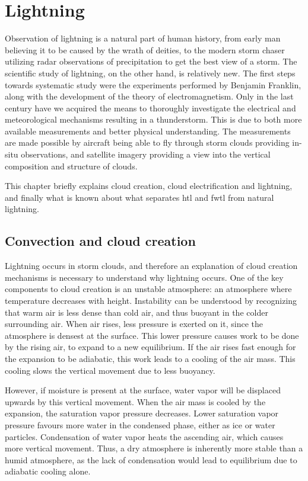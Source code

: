\setcounter{chapter}{1} 

\chapter{Lightning}\label{ch:lightning}
Observation of lightning is a  natural part of human history, from early man believing it to be caused by the wrath of deities, to the modern storm chaser utilizing radar observations of precipitation to get the best view of a storm. The scientific study of lightning, on the other hand, is relatively new. The first steps towards systematic study were the experiments performed by Benjamin Franklin, along with the development of the theory of electromagnetism. Only in the last century have we acquired the means to thoroughly investigate the electrical and meteorological mechanisms resulting in a thunderstorm. This is due to both more available measurements and better physical understanding. The measurements are made possible by aircraft being able to fly through storm clouds providing in-situ observations, and satellite imagery providing a view into the vertical composition and structure of clouds.

This chapter briefly explains cloud creation, cloud electrification and lightning, and finally what is known about what separates \acrlong{htl} and \acrlong{fwtl} from natural lightning.

\section{Convection and cloud creation}

Lightning occurs in storm clouds, and therefore an explanation of cloud creation mechanisms is necessary to understand why lightning occurs. One of the key components to cloud creation is an unstable atmosphere: an atmosphere where temperature decreases with height. Instability can be understood by recognizing that warm air is less dense than cold air, and thus buoyant in the colder surrounding air. When air rises, less pressure is exerted on it, since the atmosphere is densest at the surface. This lower pressure causes work to be done by the rising air, to expand to a new equilibrium. If the air rises fast enough for the expansion to be adiabatic, this work leads to a cooling of the air mass. This cooling slows the vertical movement due to less buoyancy.

However, if moisture is present at the surface, water vapor will be displaced upwards by this vertical movement. When the air mass is cooled by the expansion, the saturation vapor pressure decreases. Lower saturation vapor pressure favours more water in the condensed phase, either as ice or water particles. Condensation of water vapor heats the ascending air, which causes more vertical movement. Thus, a dry atmosphere is inherently more stable than a humid atmosphere, as the lack of condensation would lead to equilibrium due to adiabatic cooling alone.

